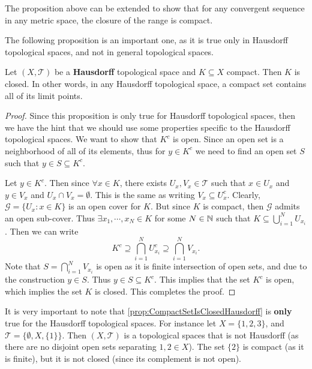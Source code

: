 \begin{remark}
	The proposition above can be extended to show that for any convergent sequence in any metric space, the closure of the range is compact.
\end{remark}

The following proposition is an important one, as it is true only in Hausdorff topological spaces, and not in general topological spaces.

\begin{proposition}
	\label{prop:CompactSetIsClosedHausdorff}
	Let $(X,\mathcal{T})$ be a \textbf{Hausdorff} topological space and $K \subseteq X$ compact. Then $K$ is closed. In other words, in any Hausdorff topological space, a compact set contains all of its limit points. 
\end{proposition}

\begin{proof}
	Since this proposition is only true for Hausdorff topological spaces, then we have the hint that we should use some properties specific to the Hausdorff topological spaces. We want to show that $K^c$ is open. Since an open set is a neighborhood of all of its elements, thus for $y \in K^c$ we need to find an open set $S$ such that $y \in S \subseteq K^c$.
	
	Let $y \in K^c$. Then since $\forall x \in K$, there exists $U_x, V_x \in \mathcal{T}$ such that $ x \in U_x$ and $y \in V_x$ and $U_x \cap V_x = \emptyset$. This is the same as writing $V_x \subseteq U_x^c$. Clearly, $\mathcal{G} = \{ U_x: x \in K \}$ is an open cover for $K$. But since $K$ is compact, then $\mathcal{G}$ admits an open sub-cover. Thus $\exists x_1, \cdots, x_N \in K$ for some $N \in \mathbb{N}$ such that $K \subseteq \bigcup_{i=1}^{N} U_{x_i}$. Then we can write
	\[ K^c \supseteq \bigcap_{i=1}^{N} U_{x_i}^c \supseteq \bigcap_{i=1}^{N} V_{x_i}. \]
	Note that $S = \bigcap_{i=1}^{N} V_{x_i} $ is open as it is finite intersection of open sets, and due to the construction $y \in S$. Thus $ y \in S \subseteq K^c$. This implies that the set $K^c$ is open, which implies the set $K$ is closed. This completes the proof. 
\end{proof}

\begin{remark}
	It is very important to note that \autoref{prop:CompactSetIsClosedHausdorff} is \textbf{only} true for the Hausdorff topological spaces. For instance let $X = \{1,2,3\}$, and $\mathcal{T} = \{ \emptyset, X, \{1\} \}$. Then $(X,\mathcal{T})$ is a topological spaces that is not Hausdorff (as there are no disjoint open sets separating $1,2 \in X$). The set $\{2\}$ is compact (as it is finite), but it is not closed (since its complement is not open).
\end{remark}


